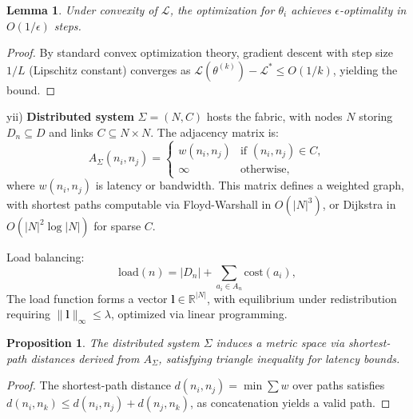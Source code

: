\documentclass{amsart}
\newtheorem{lem}{Lemma}
\newtheorem{prop}{Proposition}
\newcommand\R{\mathbb R}
\begin{document}
\begin{lem} \label{lem:analytical_convergence}
Under convexity of \( \mathcal{L} \), the optimization for \( \theta_i \) achieves \( \epsilon \)-optimality in \( O(1/\epsilon) \) steps.
\end{lem}

\begin{proof}
By standard convex optimization theory, gradient descent with step size \( 1/L \) (Lipschitz constant) converges as \( \mathcal{L}(\theta^{(k)}) - \mathcal{L}^* \leq O(1/k) \), yielding the bound.
\end{proof}


yii)  \textbf{Distributed system} 
\label{subsec:distributed_system}
\( \Sigma = (N, C) \) hosts the fabric, with nodes \( N \) storing \( D_n \subseteq D \) and links \( C \subseteq N \times N \). The adjacency matrix is:
\[
A_{\Sigma}(n_i, n_j) = \begin{cases}
w(n_i, n_j) & \text{if } (n_i, n_j) \in C, \\
\infty & \text{otherwise},
\end{cases}
\]
where \( w(n_i, n_j) \) is latency or bandwidth. This matrix defines a weighted graph, with shortest paths computable via Floyd-Warshall in \( O(|N|^3) \), or Dijkstra in \( O(|N|^2 \log |N|) \) for sparse \( C \).

Load balancing:
\[
\text{load}(n) = |D_n| + \sum_{a_i \in A_n} \text{cost}(a_i),
\]
The load function forms a vector \( \mathbf{l} \in \R^{|N|} \), with equilibrium under redistribution requiring \( \|\mathbf{l}\|_\infty \leq \lambda \), optimized via linear programming.

\begin{prop}
The distributed system \( \Sigma \) induces a metric space via shortest-path distances derived from \( A_{\Sigma} \), satisfying triangle inequality for latency bounds.
\end{prop}

\begin{proof}
The shortest-path distance \( d(n_i, n_j) = \min \sum w \) over paths satisfies \( d(n_i, n_k) \leq d(n_i, n_j) + d(n_j, n_k) \), as concatenation yields a valid path.
\end{proof}
\end{document}
